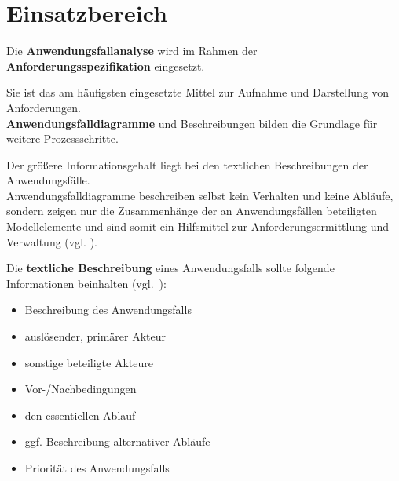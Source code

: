 \section{Einsatzbereich}

\begin{tcolorbox}
    Die \textbf{Anwendungsfallanalyse} wird im Rahmen der \textbf{Anforderungsspezifikation} eingesetzt.
\end{tcolorbox}

\noindent
Sie ist das am häufigsten eingesetzte Mittel zur Aufnahme und Darstellung von Anforderungen.\\

\noindent
\textbf{Anwendungsfalldiagramme} und Beschreibungen bilden die Grundlage für weitere Prozessschritte.

\vspace{2mm}
\begin{tcolorbox}
Der größere Informationsgehalt liegt bei den textlichen Beschreibungen der Anwendungsfälle.\\

\noindent
Anwendungsfalldiagramme beschreiben selbst kein Verhalten und keine Abläufe, sondern zeigen nur die Zusammenhänge der an Anwendungsfällen beteiligten Modellelemente und sind somit ein Hilfsmittel zur Anforderungsermittlung und Verwaltung (vgl. \cite[213]{Oes05}).
\end{tcolorbox}
\vspace{2mm}

\noindent
Die \textbf{textliche Beschreibung} eines Anwendungsfalls sollte folgende Informationen beinhalten (vgl.~\cite[51]{Buh09}):

\begin{itemize}
    \item Beschreibung des Anwendungsfalls
    \item auslösender, primärer Akteur
    \item sonstige beteiligte Akteure
    \item Vor-/Nachbedingungen
    \item den essentiellen Ablauf
    \item ggf. Beschreibung alternativer Abläufe
    \item Priorität des Anwendungsfalls
\end{itemize}

